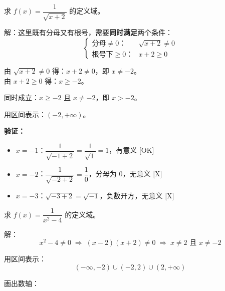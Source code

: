 \begin{examplebox}[10]
求 \(f(x) = \dfrac{1}{\sqrt{x + 2}}\) 的定义域。

解：这里既有分母又有根号，需要\textbf{同时满足}两个条件：
\[
\begin{cases}
\mbox{分母} \neq 0：& \sqrt{x + 2} \neq 0 \\
\mbox{根号下} \ge 0：& x + 2 \ge 0
\end{cases}
\]

由 \(\sqrt{x + 2} \neq 0\) 得：\(x + 2 \neq 0\)，即 \(x \neq -2\)。\\
由 \(x + 2 \ge 0\) 得：\(x \ge -2\)。

同时成立：\(x \ge -2\) 且 \(x \neq -2\)，即 \(x > -2\)。

用区间表示：\((-2, +\infty)\)。

\textbf{验证：}
\begin{itemize}
  \item \(x = -1\)：\(\dfrac{1}{\sqrt{-1 + 2}} = \dfrac{1}{\sqrt{1}} = 1\)，有意义 [OK]
  \item \(x = -2\)：\(\dfrac{1}{\sqrt{-2 + 2}} = \dfrac{1}{0}\)，分母为 0，无意义 [X]
  \item \(x = -3\)：\(\sqrt{-3 + 2} = \sqrt{-1}\)，负数开方，无意义 [X]
\end{itemize}
\end{examplebox}

\begin{examplebox}[11]
求 \(f(x) = \dfrac{1}{x^2 - 4}\) 的定义域。

解：
\[
x^2 - 4 \neq 0 \;\Longrightarrow\; (x - 2)(x + 2) \neq 0 \;\Longrightarrow\; x \neq 2 \mbox{ 且 } x \neq -2
\]

用区间表示：
\[
(-\infty, -2) \cup (-2, 2) \cup (2, +\infty)
\]

画出数轴：
\begin{center}
\end{center}
\end{examplebox}

